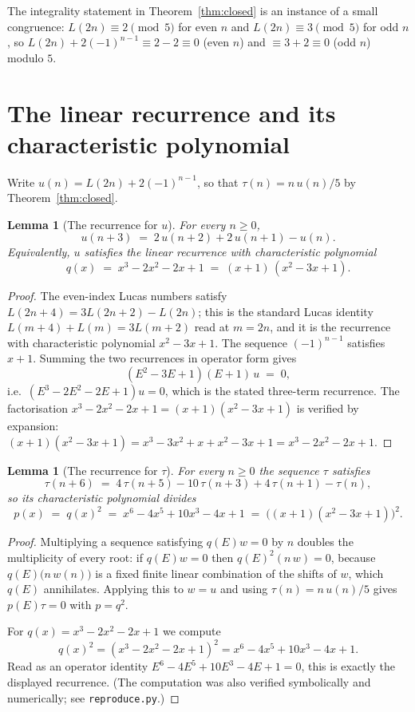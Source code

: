 \documentclass[11pt]{article}
\newtheorem{lemma}[theorem]{Lemma}
\theoremstyle{definition}
\theoremstyle{remark}
\newcommand{\tauc}{\tau}
\begin{document}
The integrality statement in Theorem~\ref{thm:closed} is an instance of a small
congruence: $L(2n) \equiv 2 \pmod 5$ for even $n$ and $L(2n) \equiv 3 \pmod 5$
for odd $n$, so $L(2n) + 2(-1)^{n-1} \equiv 2 - 2 \equiv 0$ (even $n$) and
$\equiv 3 + 2 \equiv 0$ (odd $n$) modulo $5$.

\section{The linear recurrence and its characteristic polynomial}

Write $u(n) = L(2n) + 2(-1)^{n-1}$, so that $\tauc(n) = n\,u(n)/5$ by
Theorem~\ref{thm:closed}.

\begin{lemma}[The recurrence for $u$]
\label{lem:urec}
For every $n \ge 0$,
\[
u(n+3) \;=\; 2\,u(n+2) + 2\,u(n+1) - u(n).
\]
Equivalently, $u$ satisfies the linear recurrence with characteristic
polynomial
\[
q(x) \;=\; x^{3} - 2x^{2} - 2x + 1 \;=\; (x+1)\,(x^{2}-3x+1).
\]
\end{lemma}

\begin{proof}
The even-index Lucas numbers satisfy
$L(2n+4) = 3L(2n+2) - L(2n)$; this is the standard Lucas identity
$L(m+4) + L(m) = 3L(m+2)$ read at $m = 2n$, and it is the recurrence with
characteristic polynomial $x^{2}-3x+1$. The sequence $(-1)^{n-1}$ satisfies
$x+1$. Summing the two recurrences in operator form gives
\[
(E^{2}-3E+1)(E+1)\,u \;=\; 0,
\]
i.e.\ $(E^{3}-2E^{2}-2E+1)u = 0$, which is the stated three-term recurrence.
The factorisation $x^{3}-2x^{2}-2x+1 = (x+1)(x^{2}-3x+1)$ is verified by
expansion: $(x+1)(x^{2}-3x+1) = x^{3}-3x^{2}+x + x^{2}-3x+1 = x^{3}-2x^{2}-2x+1$.
\end{proof}

\begin{lemma}[The recurrence for $\tauc$]
\label{lem:taurec}
For every $n \ge 0$ the sequence $\tauc$ satisfies
\[
\tauc(n+6) \;=\; 4\,\tauc(n+5) - 10\,\tauc(n+3) + 4\,\tauc(n+1) - \tauc(n),
\]
so its characteristic polynomial divides
\[
p(x) \;=\; q(x)^{2} \;=\; x^{6} - 4x^{5} + 10x^{3} - 4x + 1
\;=\; \bigl((x+1)(x^{2}-3x+1)\bigr)^{2}.
\]
\end{lemma}

\begin{proof}
Multiplying a sequence satisfying $q(E)w = 0$ by $n$ doubles the multiplicity of
every root: if $q(E)w = 0$ then $q(E)^{2}(n\,w) = 0$, because
$q(E)\bigl(n\,w(n)\bigr)$ is a fixed finite linear combination of the shifts of
$w$, which $q(E)$ annihilates. Applying this to $w = u$ and using
$\tauc(n) = n\,u(n)/5$ gives $p(E)\tauc = 0$ with $p = q^{2}$.

For $q(x) = x^{3}-2x^{2}-2x+1$ we compute
\[
q(x)^{2} = (x^{3}-2x^{2}-2x+1)^{2} = x^{6} - 4x^{5} + 10x^{3} - 4x + 1 .
\]
Read as an operator identity $E^{6} - 4E^{5} + 10E^{3} - 4E + 1 = 0$, this is
exactly the displayed recurrence. (The computation was also verified
symbolically and numerically; see \texttt{reproduce.py}.)
\end{proof}
\end{document}
